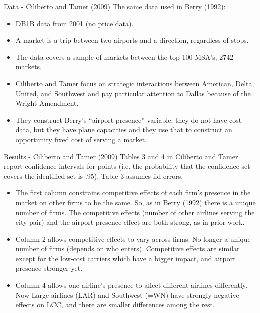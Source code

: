 \documentclass[xcolor=pdftex,dvipsnames,table,mathserif]{beamer}
\begin{document}
\begin{frame}{Data - Ciliberto and Tamer (2009)}
The same data used in Berry (1992):
\begin{itemize}
\item DB1B data from 2001 (no price data).  
\item A market is a trip between two airports and a direction, regardless of stops. 
\item The data covers a sample of markets between the top 100 MSA's; 2742 markets.   \item Ciliberto and Tamer focus on strategic interactions between American, Delta, United, and Southwest and pay particular attention to Dallas because of the Wright Amendment.  
\item They construct Berry's ``airport presence'' variable; they do not have cost data, but they have plane capacities and they use that to construct an opportunity fixed cost of serving a market.
\end{itemize}
\end{frame}
\begin{frame}{Results - Ciliberto and Tamer (2009)}
\small
Tables 3 and 4 in Ciliberto and Tamer report confidence intervals for points (i.e. the probability that the confidence set covers the identified set is .95). Table 3 assumes iid errors.  \\
\begin{itemize}
\item The first column constrains competitive effects of each firm's presence in the market on other firms to be the
same.  So, as in Berry (1992) there is a unique number of
firms. The competitive effects (number of other airlines 
serving the city-pair) and the airport presence effect are
both strong, as in prior work.
\item Column 2 allows competitive effects to vary across firms. No longer
a unique number of firms (depends on who enters). Competitive effects 
are similar except for the low-cost carriers
which have a bigger impact, and airport presence stronger yet.\\
\item Column 4 allows one airline's presence to affect different airlines differently. Now Large airlines (LAR) and Southwest (=WN) have strongly negative effects on LCC, and there
are smaller differences among the rest.
\end{itemize}
\end{frame}
\end{document}
